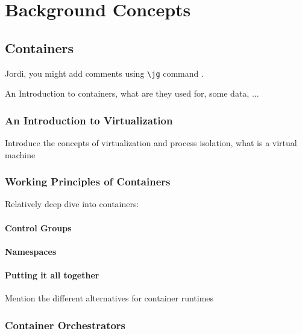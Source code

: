 \chapter{Background Concepts} \label{chap:background}

\section{Containers} \label{sec:containers}

Jordi, you might add comments using \texttt{\textbackslash jg} command .

An Introduction to containers, what are they used for, some data, ...

\subsection{An Introduction to Virtualization}

Introduce the concepts of virtualization and process isolation, what is a virtual machine

\subsection{Working Principles of Containers}

Relatively deep dive into containers:

\subsubsection*{Control Groups}

\subsubsection*{Namespaces}

\subsubsection*{Putting it all together}

Mention the different alternatives for container runtimes

\subsection{Container Orchestrators}


